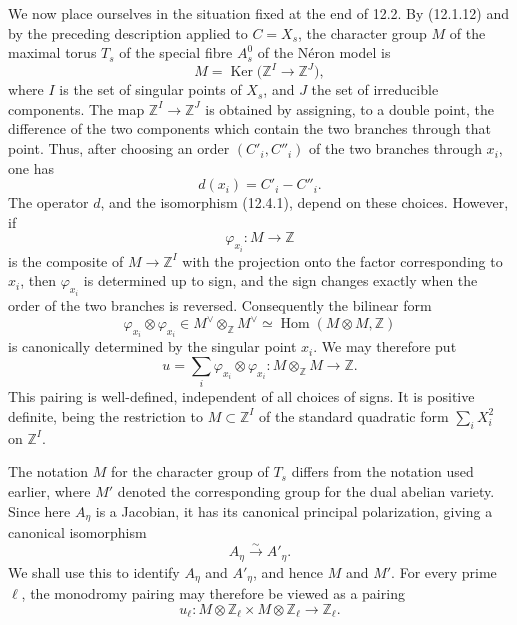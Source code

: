 \documentclass[11pt]{article}
\providecommand{\Hom}{\operatorname{Hom}}
\providecommand{\Ker}{\operatorname{Ker}}
\providecommand{\Z}{\mathbb Z}
\begin{document}
We now place ourselves in the situation fixed at the end of 12.2.  By (12.1.12) and by the preceding description applied to \(C=X_s\), the character group \(M\) of the maximal torus \(T_s\) of the special fibre \(A^0_s\) of the N\'eron model is
\begin{equation}\tag{12.4.1}
        M=\Ker\bigl(\Z^I\longrightarrow \Z^J\bigr),
\end{equation}
where \(I\) is the set of singular points of \(X_s\), and \(J\) the set of irreducible components.  The map \(\Z^I\to\Z^J\) is obtained by assigning, to a double point, the difference of the two components which contain the two branches through that point.  Thus, after choosing an order \((C'_i,C''_i)\) of the two branches through \(x_i\), one has
\begin{equation}\tag{12.4.2}
        d(x_i)=C'_i-C''_i.
\end{equation}
The operator \(d\), and the isomorphism (12.4.1), depend on these choices.  However, if
\begin{equation}\tag{12.4.3}
        \varphi_{x_i}:M\longrightarrow \Z
\end{equation}
is the composite of \(M\to\Z^I\) with the projection onto the factor corresponding to \(x_i\), then \(\varphi_{x_i}\) is determined up to sign, and the sign changes exactly when the order of the two branches is reversed.  Consequently the bilinear form
\begin{equation}\tag{12.4.4}
        \varphi_{x_i}\otimes\varphi_{x_i}\in
        M^\vee\otimes_\Z M^\vee\simeq \Hom(M\otimes M,\Z)
\end{equation}
is canonically determined by the singular point \(x_i\).  We may therefore put
\begin{equation}\tag{12.4.5}
        u=\sum_i \varphi_{x_i}\otimes\varphi_{x_i}:
        M\otimes_\Z M\longrightarrow \Z.
\end{equation}
This pairing is well-defined, independent of all choices of signs.  It is positive definite, being the restriction to \(M\subset\Z^I\) of the standard quadratic form \(\sum_i X_i^2\) on \(\Z^I\).

The notation \(M\) for the character group of \(T_s\) differs from the notation used earlier, where \(M'\) denoted the corresponding group for the dual abelian variety.  Since here \(A_\eta\) is a Jacobian, it has its canonical principal polarization, giving a canonical isomorphism
\begin{equation}\tag{12.4.6}
        A_\eta\xrightarrow{\sim}A'_\eta.
\end{equation}
We shall use this to identify \(A_\eta\) and \(A'_\eta\), and hence \(M\) and \(M'\).  For every prime \(\ell\), the monodromy pairing may therefore be viewed as a pairing
\begin{equation}\tag{12.4.7}
        u_\ell:M\otimes\Z_\ell\times M\otimes\Z_\ell\longrightarrow \Z_\ell.
\end{equation}
\end{document}

